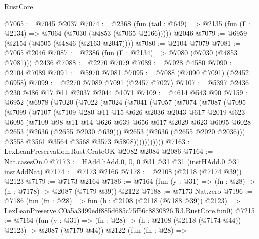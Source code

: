 \begin{lexlean}{RustCore}
\begin{coremodule}
@7065 := @7045 @2037
@7074 := @2368
    (fun (tail : @649) => @2135 (fun (Γ : @2134) => @7064 (@7030 (@4853 (@7065 @2166)))))
    @2046
@7079 := @6959 (@2154 (@4505 (@4846 (@2163 @2047))))
@7080 := @2104 @7079
@7081 := @7065 @2046
@7087 := @2386 (fun (Γ : @2134) => @7080 (@7030 (@4853 @7081))) @2436
@7088 := @2270 @7079
@7089 := @7028 @4580
@7090 := @2104 @7089
@7091 := @5970 @7081
@7095 := @7088 (@7090 @7091) (@2452 @6958)
@7099 := @2270 @7089 @7091 (@2457 @7027)
@7107 := @5397 @2436 @230 @486 @17 @11 @2037 @2044 @1071
@7109 := @4614 @543 @90
@7159 := @6952
    (@6978
      (@7020
        (@7022
          (@7024
            (@7041
              (@7057
                (@7074
                  (@7087
                    (@7095
                      (@7099
                        (@7107
                          (@7109
                            @280
                            @11
                            @15
                            @626
                            @2036
                            @2043
                            @617
                            @2019
                            @623
                            @6095
                            (@7109
                              @98
                              @11
                              @14
                              @626
                              @639
                              @656
                              @617
                              @2029
                              @623
                              @6095
                              @6028
                              @2653
                              (@2636 (@2655 @2030 @639)))
                            @2653
                            (@2636 (@2655 @2020 @2036)))
                          @3558
                          @3561
                          @3564
                          @3568
                          @3573
                          @5808)))))))))))
@7163 := LexLeanPreservation.Rust.CrateOK @2082 @2084 @2086
@7164 := Nat.casesOn.{0}
@7173 := HAdd.hAdd.{0, 0, 0} @31 @31 @31 (instHAdd.{0} @31 instAddNat)
@7174 := @7173 @2166
@7178 := @2108 (@2118 (@7174 @39)) @2123
@7179 := @7173 @2164
@7186 := @7164 (fun (y : @31) => (fn : @28) -> (h : @7178) -> @2087 (@7179 @39)) @2122
@7188 := @7173 Nat.zero
@7196 := @7186
    (fun (fn : @28) =>
    fun (h : @2108 (@2118 (@7188 @39)) @2123) =>
    LexLeanPreserve.C0a5a3499edf885d685c75f56c8830826.R3.RustCore.fun0)
@7215 := @7164
    (fun (y : @31) => (fn : @28) -> (h : @2108 (@2118 (@7174 @44)) @2123) -> @2087 (@7179 @44))
    @2122
    (fun (fn : @28) =>

\end{coremodule}
\end{lexlean}
